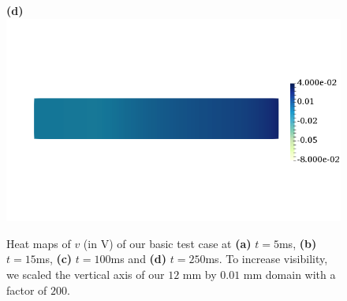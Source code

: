 \documentclass[12pt,a4paper]{article}
\begin{document}
\begin{figure}
\begin{minipage}{0.47\textwidth}
  \textbf{(d)} \includegraphics[trim=0cm 4cm 0cm 4cm, clip=true, width=0.9\linewidth]{v250}
    \end{minipage}
    \caption{Heat maps of $v$ (in V) of our basic test case at \textbf{(a)} $t=5$ms, \textbf{(b)} $t=15$ms, \textbf{(c)} $t=100$ms and \textbf{(d)} $t=250$ms. To increase visibility, we scaled the vertical axis of our $12$ mm by $0.01$ mm domain with a factor of $200$.}
    \label{fig:1}
\end{figure}
%
\end{document}
